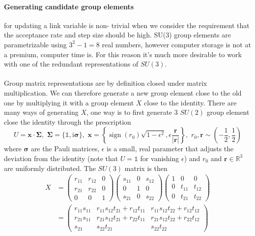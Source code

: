 \documentclass[a4paper,10pt]{article}
\begin{document}
\paragraph{Generating candidate group elements} for updating a link variable is non- trivial when we consider the requirement that the acceptance rate and step size should be high. SU(3) group elements are parametrizable using $3^2-1 = 8$ real numbers, however computer storage is not at a premium, computer time is. For this reason it's much more desirable to work with one of the redundant representations of $SU(3)$.\\\\Group matrix representations are by definition closed under matrix multiplication. We can therefore generate a new group element close to the old one by multiplying it with a group element $X$ close to the identity. There are many ways of generating $X$, one way is to first generate 3 $SU(2)$ group element close the identity through the prescription
\begin{equation}
U=\boldsymbol{x} \cdot \boldsymbol{\Sigma}, \,\,\boldsymbol{\Sigma} = \{\mathbb{1},\mathrm{i}\boldsymbol{\sigma} \},\,\,\boldsymbol{x} = \left\{\operatorname{sign}(r_0)\sqrt{1-\epsilon^2},\epsilon \frac{\boldsymbol{r}}{|\boldsymbol{r}|}  \right\},\,\,r_0,\boldsymbol{r} \sim \left( -\frac{1}{2},\frac{1}{2} \right)
\end{equation}
where $\boldsymbol{\sigma}$ are the Pauli matrices, $\epsilon$ is a small, real parameter that adjusts the deviation from the identity (note that $U=\mathbb{1}$ for vanishing $\epsilon$) and $r_0$ and $\boldsymbol{r}\in \mathbb{R}^3$ are uniformly distributed. The $SU(3)$ matrix is then
\begin{equation}
\begin{aligned} 
X&=\left(\begin{array}{ccc}
r_{11} & r_{12} & 0 \\
r_{21} & r_{22} & 0 \\
0 & 0 & 1
\end{array}\right)\left(\begin{array}{ccc}
s_{11} & 0 & s_{12} \\
0 & 1 & 0 \\
s_{21} & 0 & s_{22}
\end{array}\right)\left(\begin{array}{lcc}
1 & 0 & 0 \\
0 & t_{11} & t_{12} \\
0 & t_{21} & t_{22}
\end{array}\right)\\
&=\left(\begin{array}{ccc}
r_{11} s_{11} & r_{11} s_{12} t_{21}+r_{12} t_{11} & r_{11} s_{12} t_{22}+r_{12} t_{12} \\
r_{21} s_{11} & r_{21} s_{12} t_{21}+r_{22} t_{11} & r_{21} s_{12} t_{22}+r_{22} t_{12} \\
s_{21} & s_{22} t_{21} & s_{22} t_{22}
\end{array}\right)
\end{aligned}
\end{equation}
\end{document}
